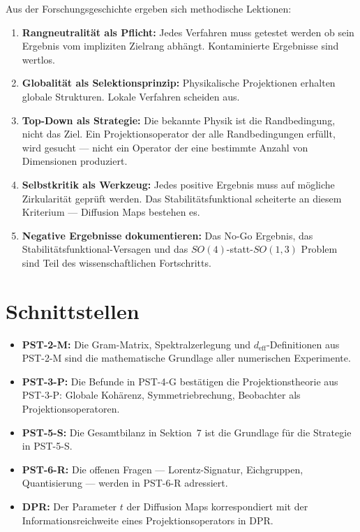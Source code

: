 \documentclass[11pt,a4paper]{article}
\theoremstyle{plain}
\theoremstyle{definition}
\newcommand{\deff}{d_{\mathrm{eff}}}
\begin{document}
Aus der Forschungsgeschichte ergeben sich methodische Lektionen:

\begin{enumerate}
  \item \textbf{Rangneutralit\"{a}t als Pflicht:} Jedes Verfahren muss
        getestet werden ob sein Ergebnis vom impliziten Zielrang abh\"{a}ngt.
        Kontaminierte Ergebnisse sind wertlos.

  \item \textbf{Globalit\"{a}t als Selektionsprinzip:} Physikalische
        Projektionen erhalten globale Strukturen. Lokale Verfahren scheiden
        aus.

  \item \textbf{Top-Down als Strategie:} Die bekannte Physik ist die
        Randbedingung, nicht das Ziel. Ein Projektionsoperator der alle
        Randbedingungen erf\"{u}llt, wird gesucht --- nicht ein Operator
        der eine bestimmte Anzahl von Dimensionen produziert.

  \item \textbf{Selbstkritik als Werkzeug:} Jedes positive Ergebnis
        muss auf m\"{o}gliche Zirkularit\"{a}t gepr\"{u}ft werden.
        Das Stabilit\"{a}tsfunktional scheiterte an diesem Kriterium ---
        Diffusion Maps bestehen es.

  \item \textbf{Negative Ergebnisse dokumentieren:} Das No-Go Ergebnis,
        das Stabilit\"{a}tsfunktional-Versagen und das $SO(4)$-statt-$SO(1,3)$
        Problem sind Teil des wissenschaftlichen Fortschritts.
\end{enumerate}

\section{Schnittstellen}

\begin{itemize}
  \item \textbf{PST-2-M:} Die Gram-Matrix, Spektralzerlegung und
        $\deff$-Definitionen aus PST-2-M sind die mathematische
        Grundlage aller numerischen Experimente.
  \item \textbf{PST-3-P:} Die Befunde in PST-4-G best\"{a}tigen die
        Projektionstheorie aus PST-3-P: Globale Koh\"{a}renz,
        Symmetriebrechung, Beobachter als Projektionsoperatoren.
  \item \textbf{PST-5-S:} Die Gesamtbilanz in Sektion~7 ist die
        Grundlage f\"{u}r die Strategie in PST-5-S.
  \item \textbf{PST-6-R:} Die offenen Fragen --- Lorentz-Signatur,
        Eichgruppen, Quantisierung --- werden in PST-6-R adressiert.
  \item \textbf{DPR:} Der Parameter $t$ der Diffusion Maps korrespondiert
        mit der Informationsreichweite eines Projektionsoperators in DPR.
\end{itemize}
\end{document}

